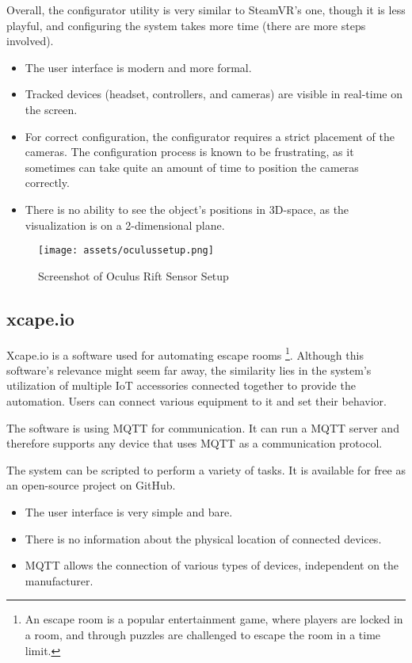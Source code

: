 Overall, the configurator utility is very similar to SteamVR’s one, though it
is less playful, and configuring the system takes more time (there are more steps
involved).

\begin{itemize}
\item The user interface is modern and more formal.
\item Tracked devices (headset, controllers, and cameras) are visible in real-time
on the screen.
\item For correct configuration, the configurator requires a strict placement
of the cameras. The configuration process is known to be frustrating,
as it sometimes can take quite an amount of time to position the cameras correctly.
\item There is no ability to see the object’s positions in 3D-space, as the visualization is
on a 2-dimensional plane.
\end{itemize}

\begin{figure}[h]{}
\centering\texttt{[image: assets/oculussetup.png]}
\caption{Screenshot of Oculus Rift Sensor Setup}
\end{figure}

\hypertarget{x-xcape.io}{\subsection{xcape.io}}
Xcape.io is a software used for automating escape rooms
\footnote{An escape room is a popular entertainment game, where players are locked in a room, and through puzzles are challenged to escape the room in a time limit.}.
Although this software’s relevance might seem far away,
the similarity lies in the system’s utilization of multiple IoT accessories
connected together to provide the automation. Users can connect various
equipment to it and set their behavior.

The software is using MQTT for communication. It can run a MQTT server and
therefore supports any device that uses MQTT as a communication protocol.

The system can be scripted to perform a variety of tasks. It is available
for free as an open-source project on GitHub.

\begin{itemize}
\item The user interface is very simple and bare.
\item There is no information about the physical location of connected devices.
\item MQTT allows the connection of various types of devices, independent on the manufacturer.
\end{itemize}

